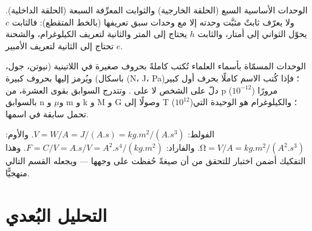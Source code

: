 \begin{omfigure}

{\small الوحدات الأساسية السبع (الحلقة الخارجية) والثوابت المعرِّفة
السبعة (الحلقة الداخلية). ولا يعرّف ثابتٌ مثبَّت وحدته إلا مع وحدات
سبق تعريفها (بالخط المتقطع): فالثابت $c$ يحوّل الثواني إلى أمتار،
والثابت $h$ يحتاج إلى المتر والثانية لتعريف الكيلوغرام، والشحنة $e$
تحتاج إلى الثانية لتعريف الأمبير.}
\end{omfigure}

\begin{remark}\label{rem:b1:units-dimensions:names}
الوحدات المسمّاة بأسماء العلماء تُكتب كاملةً بحروف صغيرة في اللاتينية
(نيوتن، جول، باسكال) ويُرمز إليها بحروف كبيرة (\unit{N}، \unit{J}،
\unit{Pa})؛ فإذا كُتب الاسم كاملًا بحرف أول كبير دلّ على الشخص لا على
. وتتدرج السوابق بقوى العشرة، من p ($10^{-12}$) مرورًا بالسوابق
n و$\mu$ و m و k و M و G وصولًا إلى T ($10^{12}$)؛ والكيلوغرام هو
 الوحيدة التي تحمل سابقة في اسمها.
\end{remark}

\begin{example}\label{ex:b1:units-dimensions:unpack}
الفولط: $\unit{V} = \unit{W/A} = \unit{J/(A.s)} = \unit{kg.m^2/(A.s^3)}$.
والأوم: $\unit{\ohm} = \unit{V/A} = \unit{kg.m^2/(A^2.s^3)}$. والفاراد:
$\unit{F} = \unit{C/V} = \unit{A.s/V} = \unit{A^2.s^4/(kg.m^2)}$. وهذا
التفكيك أضمن اختبار للتحقق من أن صيغةً حُفظت على وجهها --- ويجعله
القسم التالي منهجيًّا.
\end{example}

\section{التحليل البُعدي}

